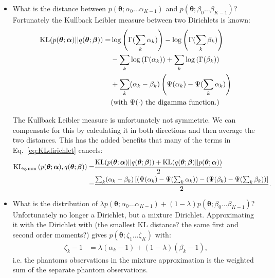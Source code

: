 \documentclass[oneside,english]{scrbook}
\begin{document}
\begin{itemize}
\item What is the distance between $p(\bm{\theta};
  \alpha_{0} \ldots \alpha_{K-1})$ and $p(\bm{\theta}; \beta_{0}
  \ldots \beta_{K-1})$? Fortunately the Kullback Leibler measure between
  two Dirichlets is known:
  \begin{align}
    \label{eq:KLdirichlet}
    \text{KL}(p(\bm{\theta};\bm{\alpha})||q(\bm{\theta};\bm{\beta}))
    =& \log\left(\Gamma(\sum_k\alpha_k)\right)-\log\left(\Gamma(\sum_k\beta_k)\right) \notag\\
    &- \sum_k\log\left(\Gamma(\alpha_k)\right)+\sum_k\log\left(\Gamma(\beta_k)\right) \notag\\
    &+ \sum_k(\alpha_k-\beta_k)\left(\Psi(\alpha_k)-\Psi(\sum_k\alpha_k)\right)\\
    & (\text{with } \Psi(\cdot) \text{ the digamma function}.)\notag
  \end{align}

  The Kullback Leibler measure is unfortunately not symmetric. We can
  compensate for this by calculating it in both directions and then
  average the two distances. This has the added benefits that many of
  the terms in Eq.~\ref{eq:KLdirichlet} cancels:
\begin{align}
  \label{eq:SymmKLdirichlet}
  \text{KL}_{\text{symm}}\left(p(\bm{\theta};\bm{\alpha}),q(\bm{\theta};\bm{\beta})\right)
  =&\frac{\text{KL}(p(\bm{\theta};\bm{\alpha})||q(\bm{\theta};\bm{\beta}))+
    \text{KL}(q(\bm{\theta};\bm{\beta})||p(\bm{\theta};\bm{\alpha}))}{2} \notag\\
  =& \frac{\sum_k(\alpha_k-\beta_k)
  \left[\left(\Psi(\alpha_k) - \Psi(\sum_k\alpha_k)\right) - \left(\Psi(\beta_k)  - \Psi(\sum_k\beta_k)\right)\right]}{2}.
\end{align}

\item What is the distribution of $\lambda p(\bm{\theta};
  \alpha_{0} \ldots \alpha_{K-1}) + (1-\lambda)p(\bm{\theta};
  \beta_{0} \ldots \beta_{K-1})$? Unfortunately no longer a Dirichlet, but a
  mixture Dirichlet. Approximating it with the Dirichlet with (the
  smallest KL distance? the same first and second order moments?)
  gives $p(\bm{\theta}; \zeta_1 \ldots \zeta_K)$ with:
  \begin{align}
    \zeta_k-1 & = \lambda(\alpha_k-1) + (1-\lambda)(\beta_k-1),
  \end{align}
  i.e. the phantoms observations in the mixture approximation is the
  weighted sum of the separate phantom observations.
\end{itemize}
\end{document}
